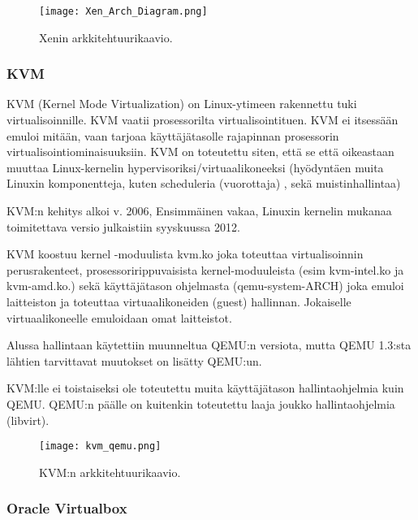 \begin{figure}[H]
\centering
\texttt{[image: Xen\_Arch\_Diagram.png]}
\caption{Xenin arkkitehtuurikaavio.}
\end{figure}


\subsubsection{KVM}
KVM (Kernel Mode Virtualization) on Linux-ytimeen rakennettu tuki virtualisoinnille. KVM vaatii prosessorilta virtualisointituen. KVM ei itsessään emuloi mitään, vaan tarjoaa käyttäjätasolle rajapinnan prosessorin virtualisointiominaisuuksiin. KVM on toteutettu siten, että se että oikeastaan muuttaa Linux-kernelin hypervisoriksi/virtuaalikoneeksi  (hyödyntäen muita Linuxin komponentteja, kuten scheduleria (vuorottaja) , sekä muistinhallintaa)

KVM:n kehitys alkoi v. 2006, Ensimmäinen vakaa, Linuxin kernelin mukanaa toimitettava versio julkaistiin syyskuussa 2012.

KVM koostuu kernel -moduulista kvm.ko joka toteuttaa virtualisoinnin perusrakenteet, prosessoririppuvaisista kernel-moduuleista (esim kvm-intel.ko ja kvm-amd.ko.) sekä käyttäjätason ohjelmasta (qemu-system-ARCH) joka emuloi laitteiston ja toteuttaa virtuaalikoneiden (guest) hallinnan. Jokaiselle virtuaalikoneelle emuloidaan omat laitteistot.

Alussa hallintaan käytettiin muunneltua QEMU:n versiota, mutta QEMU 1.3:sta lähtien tarvittavat muutokset on lisätty QEMU:un. 

 KVM:lle ei toistaiseksi ole toteutettu muita käyttäjätason hallintaohjelmia kuin QEMU. QEMU:n päälle on kuitenkin toteutettu laaja joukko hallintaohjelmia (libvirt).


\begin{figure}[H]
\centering
\texttt{[image: kvm\_qemu.png]}
\caption{KVM:n arkkitehtuurikaavio.}
\end{figure}

\subsubsection{Oracle Virtualbox}


